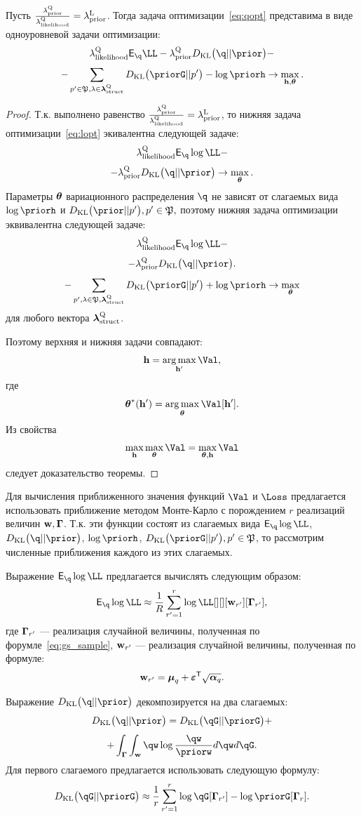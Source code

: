 \begin{theorem}
Пусть $\frac{\lambda_\text{prior}^\text{Q}}{\lambda_\text{likelihood}^\text{Q}} = \lambda_\text{prior}^\text{L}$. 
Тогда задача оптимизации~\eqref{eq:qopt} представима в виде одноуровневой задачи оптимизации:
\[
\lamLL \E_{\q}\LL - \lamCQ \KL{\q}{\prior} -
\]
\[
-\sum_{p' \in \mathfrak{P}, \lambda \in \lamS} \KL{\priorG}{p'} - \log \priorh \to \max_{\h, \teta}. 
\]
\end{theorem}
\begin{proof}
Т.к. выполнено равенство  $\frac{\lambda_\text{prior}^\text{Q}}{\lambda_\text{likelihood}^\text{Q}} = \lambda_\text{prior}^\text{L}$, то нижняя задача оптимизации~\eqref{eq:lopt} экивалентна следующей задаче:
\[
\lamLL \E_{\q} \log \LL -  
\]
\[
    -\lamCQ \KL{\q}{\prior} \to \max_{\teta}.
\]
Параметры $\boldsymbol{\theta}$ вариационного распределения $\q$ не зависят от слагаемых вида $\log \priorh$ и $\KL{\prior}{p'}, p' \in \mathfrak{P},$ поэтому нижняя задача оптимизации
эквивалентна следующей задаче:
\[
\lamLL \E_{\q} \log \LL -  
\]
\[
    -\lamCQ \KL{\q}{\prior}. 
\]
\[
-\sum_{p', \lambda \in \mathfrak{P}, \lamS} \KL{\priorG}{p'} + \log \priorh \to \max_{\teta}
\]
для любого вектора $\boldsymbol{\lambda}_\text{struct}^\text{Q}$. 


Поэтому верхняя и нижняя задачи совпадают:
\[
    \h = \argmax_{\h'} \Val,
\]
где 
\[
    \teta^{*}(\h') = \argmax_{\teta} \Val[\h'].
\]
Из свойства 
\[
    \max_{\h}\max_{\teta} \Val = \max_{\teta, \h} \Val
\]
следует доказательство теоремы.
\end{proof}


Для вычисления приближенного значения функций $\Val$ и $\Loss$ предлагается использовать приближение методом Монте-Карло с порождением $r$ реализаций величин $\mathbf{w},\boldsymbol{\Gamma}$.
Т.к. эти функции состоят из слагаемых вида $\E_{\q}\log \LL$, $\KL{\q}{\prior}$, $\log \priorh$, $\KL{\priorG}{p'}, p' \in \mathfrak{P}$, то рассмотрим численные приближения каждого из этих слагаемых.

Выражение $\E_{\q}\log \LL$ предлагается вычислять следующим образом:
\[
    \E_{\q}\log \LL \approx \frac{1}{R}\sum_{r'=1}^r \log \LL[][][\w_{r'}][\G_{r'}],
\]
где $\boldsymbol{\Gamma}_{r'}$ --- реализация случайной величины, полученная по форумле~\eqref{eq:gs_sample}, $\mathbf{w}_{r'}$ --- реализация случайной величины, полученная по формуле:
\[
\mathbf{w}_{r'} = \boldsymbol{\mu}_q + \boldsymbol{\varepsilon}^\mathsf{T} \sqrt{\boldsymbol{\alpha}_q}.
\]

Выражение $\KL{\q}{\prior}$ декомпозируется на два слагаемых:
\[
    \KL{\q}{\prior} = \KL{\qG}{\priorG} +
\]
\[
+ \int_{\G}\int_{\w}\qw\log\frac{\qw}{\priorw}d\qw d\qG.
\]
Для первого слагаемого предлагается использовать следующую формулу:
\begin{equation}
\label{eq:klg_approx}
    \KL{\qG}{\priorG} \approx \frac{1}{r}\sum_{r'=1}^r\log \qG[\G_{r'}] - \log \priorG[\G_{r}]. 
\end{equation}

